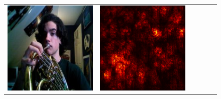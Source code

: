 \documentclass[preprint,12pt]{elsarticle}
\begin{document}
\begin{figure}[p]
\begin{tabular}{cccccc}
  \includegraphics[scale=\scale]{../visualizations/examples/imagenette/cnn/images/7.png} &
  \includegraphics[scale=\scale]{../visualizations/examples/imagenette/cnn/saliency_map/7.png} & 

\end{tabular}
\end{figure}
\end{document}

